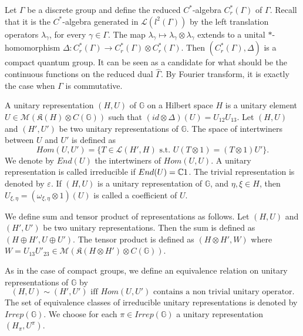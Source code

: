 \begin{Expl}
Let $\Gamma$ be a discrete group and define the reduced $C^*$-algebra $C_r^*(\Gamma)$ of $\Gamma$. Recall that it is the $C^*$-algebra generated in $\mathcal L(l^2(\Gamma))$ by the left translation operators $\lambda_\gamma$, for every $\gamma\in\Gamma$. The map $ \lambda_\gamma \mapsto \lambda_\gamma\otimes \lambda_\gamma$ extends to a unital $*$-homomorphism $\Delta :C_r^*(\Gamma)\rightarrow C_r^*(\Gamma)\otimes C_r^*(\Gamma) $. Then $(C_r^*(\Gamma),\Delta)$ is a compact quantum group. It can be seen as a candidate for what should be the continuous functions on the reduced dual $\hat\Gamma$. By Fourier transform, it is exactly the case when $\Gamma$ is commutative.
\end{Expl}

\begin{definition} A unitary representation $(H,U)$ of $\mathbb G$ on a Hilbert space $H$ is a unitary element $U \in \mathcal M(\mathfrak K(H)\otimes C(\mathbb G))$ such that $(id\otimes\Delta)(U) = U_{12}U_{13}$. Let $(H,U)$ and $(H',U')$ be two unitary representations of $\mathbb G$. The space of intertwiners between $U$ and $U'$ is defined as 
\[Hom(U,U') = \{T\in \mathcal L(H',H) \text{ s.t. }U(T\otimes 1) = (T\otimes 1) U' \}.\]
We denote by $End(U)$ the intertwiners of $Hom(U,U)$. A unitary representation is called irreducible if $End(U) = \mathbb C 1$. The trivial representation is denoted by $\varepsilon$. If $(H,U)$ is a unitary representation of $\mathbb G$, and $\eta,\xi\in H$, then $U_{\xi,\eta} = (\omega_{\xi,\eta}\otimes 1)( U )$ is called a coefficient of $U$.
\end{definition}

We define sum and tensor product of representations as follows. Let $(H,U)$ and $(H',U')$ be two unitary representations. Then the sum is defined as $(H\oplus H', U\oplus U')$. The tensor product is defined as $(H\otimes H',W)$ where $W = U_{13} U'_{23}\in \mathcal M(\mathfrak K(H\otimes H')\otimes C(\mathbb G))$. 

\begin{definition}
As in the case of compact groups, we define an equivalence relation on unitary representations of $\mathbb G$ by 
\[(H,U)\sim (H',U') \text{ iff } Hom(U,U') \text{ contains a non trivial unitary operator}.\]
The set of equivalence classes of irreducible unitary representations is denoted by $Irrep(\mathbb G)$. We choose for each $\pi\in Irrep (\mathbb G)$ a unitary representation $(H_\pi, U^{\pi})$. 
\end{definition}

